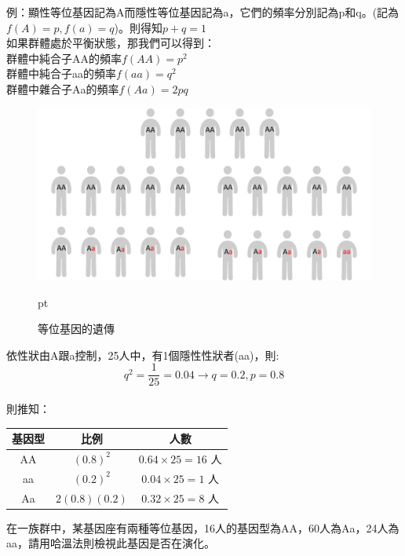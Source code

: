 \noindent
例：顯性等位基因記為A而隱性等位基因記為a，它們的頻率分別記為p和q。(記為$f(A) = p, f(a) = q$)。則得知$p + q = 1$ \\
如果群體處於平衡狀態，那我們可以得到：\\
群體中純合子AA的頻率$f(AA) = p^2$ \\
群體中純合子aa的頻率$f(aa) = q^2$ \\
群體中雜合子Aa的頻率$f(Aa) = 2pq$ \\

\begin{figure}[H]
\graphicspath{{biology/}}
\includegraphics[width=\textwidth, center]{genetic.png}
\caption{等位基因的遺傳}  pt
\label{fig:genetic}
\end{figure}

依性狀由A跟a控制，25人中，有1個隱性性狀者(aa)，則: \\
$$q^2 = \frac{1}{25} = 0.04 \rightarrow q=0.2, p=0.8 $$ \\
則推知：
\begin{table}[H]
\centering
\begin{tabular}{|c|c|c|}
\hline
基因型 & 比例          & 人數               \\ \hline
AA  & $(0.8)^2$      & $0.64 \times 25 = 16$ 人 \\ \hline
aa  & $(0.2)^2$      & $0.04 \times 25 = 1$  人 \\ \hline
Aa  & $2(0.8)(0.2)$ & $0.32 \times 25 = 8$  人  \\\hline
\end{tabular}
\end{table}

\noindent
{}

在一族群中，某基因座有兩種等位基因，16人的基因型為AA，60人為Aa，24人為aa，請用哈溫法則檢視此基因是否在演化。

